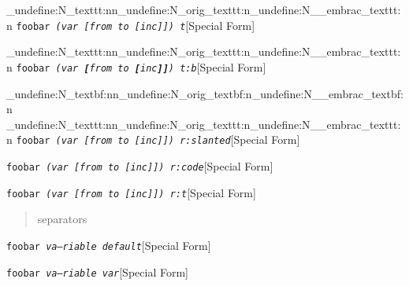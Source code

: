 \documentclass{book}
\begin{document}
\ExplSyntaxOn%
\cs_undefine:N{\embrac_texttt:nn}\cs_undefine:N{\embrac_orig_texttt:n}\cs_undefine:N{\__embrac_texttt:n}%
\ExplSyntaxOff%
%
\noindent\texttt{foobar \EmbracOn{}\textnormal{\textsl{(var \texttt{[}from to \texttt{[}inc\texttt{]]}) t}}\EmbracOff{}}\hfill[Special Form]


\ExplSyntaxOn%
\cs_undefine:N{\embrac_texttt:nn}\cs_undefine:N{\embrac_orig_texttt:n}\cs_undefine:N{\__embrac_texttt:n}%
\ExplSyntaxOff%
%
\noindent\texttt{foobar \EmbracOn{}\textnormal{\textsl{(var \texttt{\textbf{[}}from to \texttt{\textbf{[}}inc\texttt{\textbf{]]}}) t:b}}\EmbracOff{}}\hfill[Special Form]


\ExplSyntaxOn%
\cs_undefine:N{\embrac_textbf:nn}\cs_undefine:N{\embrac_orig_textbf:n}\cs_undefine:N{\__embrac_textbf:n}%
\cs_undefine:N{\embrac_texttt:nn}\cs_undefine:N{\embrac_orig_texttt:n}\cs_undefine:N{\__embrac_texttt:n}%
\ExplSyntaxOff%
%
\noindent\texttt{foobar \EmbracOn{}\textnormal{\textsl{(var \EmbracOff{}\textnormal{\textsl{[}}\EmbracOn{}from to \EmbracOff{}\textnormal{\textsl{[}}\EmbracOn{}inc\EmbracOff{}\textnormal{\textsl{]]}}\EmbracOn{}) r:slanted}}\EmbracOff{}}\hfill[Special Form]



%
\noindent\texttt{foobar \EmbracOn{}\textnormal{\textsl{(var \EmbracOff{}\textnormal{\texttt{[}}\EmbracOn{}from to \EmbracOff{}\textnormal{\texttt{[}}\EmbracOn{}inc\EmbracOff{}\textnormal{\texttt{]]}}\EmbracOn{}) r:code}}\EmbracOff{}}\hfill[Special Form]



%
\noindent\texttt{foobar \EmbracOn{}\textnormal{\textsl{(var \EmbracOff{}\textnormal{\texttt{[}}\EmbracOn{}from to \EmbracOff{}\textnormal{\texttt{[}}\EmbracOn{}inc\EmbracOff{}\textnormal{\texttt{]]}}\EmbracOn{}) r:t}}\EmbracOff{}}\hfill[Special Form]



%
\begin{quote}
\unskip{\parskip=0pt\noindent}%
separators
\end{quote}

\noindent\texttt{foobar \EmbracOn{}\textnormal{\textsl{va---riable default}}\EmbracOff{}}\hfill[Special Form]



%
\noindent\texttt{foobar \EmbracOn{}\textnormal{\textsl{\textsl{va---riable} var}}\EmbracOff{}}\hfill[Special Form]
\end{document}
